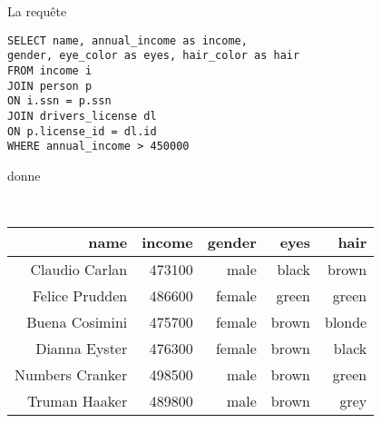 \question{}
 
La requête
\begin{verbatim}
SELECT name, annual_income as income, 
gender, eye_color as eyes, hair_color as hair
FROM income i
JOIN person p
ON i.ssn = p.ssn 
JOIN drivers_license dl
ON p.license_id = dl.id
WHERE annual_income > 450000
\end{verbatim}
donne
\begin{table}[!htp]
\centering
{\tt
\begin{tabular}{rrrrr}
name & income & gender & eyes & hair \\ \hline
Claudio Carlan & 473100 & male & black & brown \\
Felice Prudden & 486600 & female & green & green \\
Buena Cosimini & 475700 & female & brown & blonde \\
Dianna Eyster & 476300 & female & brown & black \\
Numbers Cranker & 498500 & male & brown & green \\
Truman Haaker & 489800 & male & brown & grey\\
\end{tabular}
}
\end{table}
